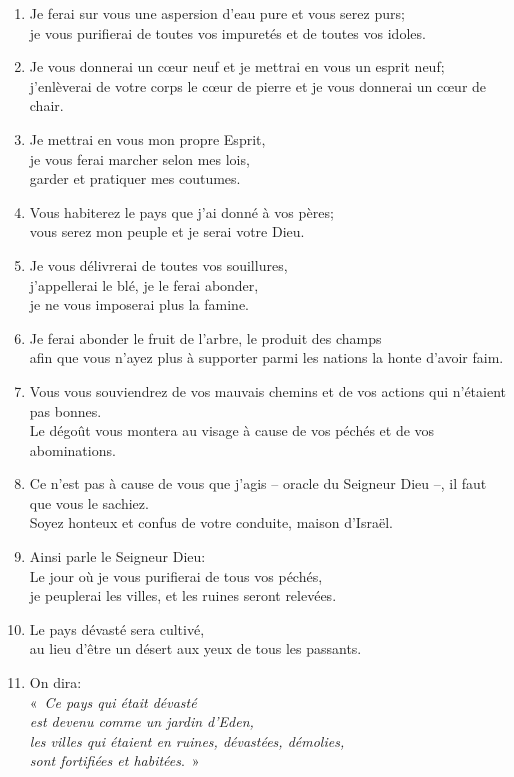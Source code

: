 \documentclass[12pt,a4paper,titlepage]{article}
\def \pslabelsep{0.2em} %
\def \psleftmargin{0em} %
\begin{document}
\begin{enumerate}[leftmargin=\psleftmargin, labelsep = \pslabelsep, label={\arabic*}, font=\color{\pscolor}\small\textsuperscript, parsep=0em, itemsep=0em, topsep=0em ]
\item Je ferai sur vous une aspersion d’eau pure et vous serez purs; \\ je vous purifierai de toutes vos impuretés et de toutes vos idoles.
\item Je vous donnerai un cœur neuf et je mettrai en vous un esprit neuf; \\ j’enlèverai de votre corps le cœur de pierre et je vous donnerai un cœur de chair.
\item Je mettrai en vous mon propre Esprit, \\ je vous ferai marcher selon mes lois, \\ garder et pratiquer mes coutumes.
\item Vous habiterez le pays que j’ai donné à vos pères; \\ vous serez mon peuple et je serai votre Dieu.
\item Je vous délivrerai de toutes vos souillures, \\ j’appellerai le blé, je le ferai abonder, \\ je ne vous imposerai plus la famine.
\item Je ferai abonder le fruit de l’arbre, le produit des champs \\ afin que vous n’ayez plus à supporter parmi les nations la honte d’avoir faim.
\item Vous vous souviendrez de vos mauvais chemins et de vos actions qui n’étaient pas bonnes. \\ Le dégoût vous montera au visage à cause de vos péchés et de vos abominations.
\item Ce n’est pas à cause de vous que j’agis – oracle du Seigneur Dieu –, il faut que vous le sachiez. \\ Soyez honteux et confus de votre conduite, maison d’Israël. \parSpace
\item Ainsi parle le Seigneur Dieu: \\ Le jour où je vous purifierai de tous vos péchés, \\ je peuplerai les villes, et les ruines seront relevées.
\item Le pays dévasté sera cultivé, \\ au lieu d’être un désert aux yeux de tous les passants.
\item On dira: \\ \decalage «~\textit{Ce pays qui était dévasté \\ \decalage est devenu comme un jardin d’Eden, \\\decalage les villes qui étaient en ruines, dévastées, démolies, \\ \decalage sont fortifiées et habitées}.~»

\end{enumerate}
\end{document}
